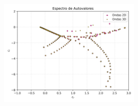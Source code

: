 \begin{figure}[H]
  \centering    
  \caption{}
  \label{fig:eigenfuns2-Re5000-Pr0071}
\end{figure}

\begin{figure}[H]
  \centering  
  \caption{}
  \label{fig:eigenfuns3-Re5000-Pr0071}
\end{figure}


\begin{figure}[H]
  \centering
    \includegraphics[width=0.6\textwidth]{figures/cap6/Re5000-Pr071-Ri1Em4/Re5000-Pr071-Ri1Em4_eigenvals.png}
  \caption{}
  \label{fig:spectra-Re5000-Pr0071}
\end{figure}



